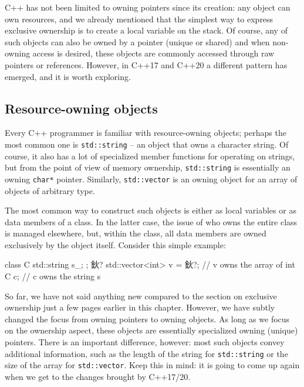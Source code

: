 C++ has not been limited to owning pointers since its creation: any object can own resources, and we already mentioned that the simplest way to express exclusive ownership is to create a local variable on the stack. Of course, any of such objects can also be owned by a pointer (unique or shared) and when non-owning access is desired, these objects are commonly accessed through raw pointers or references. However, in C++17 and C++20 a different pattern has emerged, and it is worth exploring.

\subsection{Resource-owning objects}

Every C++ programmer is familiar with resource-owning objects; perhaps the most common one is \texttt{std::string} -- an object that owns a character string. Of course, it also has a lot of specialized member functions for operating on strings, but from the point of view of memory ownership, \texttt{std::string} is essentially an owning \texttt{char*} pointer. Similarly, \texttt{std::vector} is an owning object for an array of objects of arbitrary type.

The most common way to construct such objects is either as local variables or as data members of a class. In the latter case, the issue of who owns the entire class is managed elsewhere, but, within the class, all data members are owned exclusively by the object itself. Consider this simple example:

\begin{code}
class C {
  std::string s_;
};
 鈥?
std::vector<int> v = 鈥?;    // v owns the array of int
C c;                       // c owns the string s
\end{code}

So far, we have not said anything new compared to the section on exclusive ownership just a few pages earlier in this chapter. However, we have subtly changed the focus from owning pointers to owning objects. As long as we focus on the ownership aspect, these objects are essentially specialized owning (unique) pointers. There is an important difference, however: most such objects convey additional information, such as the length of the string for \texttt{std::string} or the size of the array for \texttt{std::vector}. Keep this in mind: it is going to come up again when we get to the changes brought by C++17/20.

